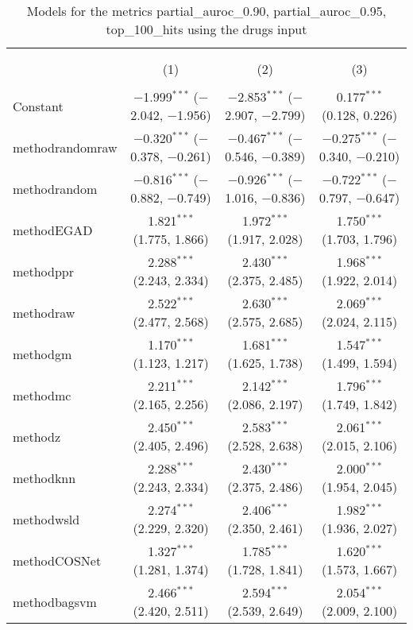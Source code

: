 
\begin{table}[!htbp] \centering 
  \caption{Models for the metrics partial_auroc_0.90, partial_auroc_0.95, top_100_hits using the drugs input} 
  \label{} 
\begin{tabular}{@{\extracolsep{5pt}}lccc} 
\\[-1.8ex]\hline 
\hline \\[-1.8ex] 
\\[-1.8ex] & (1) & (2) & (3)\\ 
\hline \\[-1.8ex] 
 Constant & $-$1.999$^{***}$ ($-$2.042, $-$1.956) & $-$2.853$^{***}$ ($-$2.907, $-$2.799) & 0.177$^{***}$ (0.128, 0.226) \\ 
  methodrandomraw & $-$0.320$^{***}$ ($-$0.378, $-$0.261) & $-$0.467$^{***}$ ($-$0.546, $-$0.389) & $-$0.275$^{***}$ ($-$0.340, $-$0.210) \\ 
  methodrandom & $-$0.816$^{***}$ ($-$0.882, $-$0.749) & $-$0.926$^{***}$ ($-$1.016, $-$0.836) & $-$0.722$^{***}$ ($-$0.797, $-$0.647) \\ 
  methodEGAD & 1.821$^{***}$ (1.775, 1.866) & 1.972$^{***}$ (1.917, 2.028) & 1.750$^{***}$ (1.703, 1.796) \\ 
  methodppr & 2.288$^{***}$ (2.243, 2.334) & 2.430$^{***}$ (2.375, 2.485) & 1.968$^{***}$ (1.922, 2.014) \\ 
  methodraw & 2.522$^{***}$ (2.477, 2.568) & 2.630$^{***}$ (2.575, 2.685) & 2.069$^{***}$ (2.024, 2.115) \\ 
  methodgm & 1.170$^{***}$ (1.123, 1.217) & 1.681$^{***}$ (1.625, 1.738) & 1.547$^{***}$ (1.499, 1.594) \\ 
  methodmc & 2.211$^{***}$ (2.165, 2.256) & 2.142$^{***}$ (2.086, 2.197) & 1.796$^{***}$ (1.749, 1.842) \\ 
  methodz & 2.450$^{***}$ (2.405, 2.496) & 2.583$^{***}$ (2.528, 2.638) & 2.061$^{***}$ (2.015, 2.106) \\ 
  methodknn & 2.288$^{***}$ (2.243, 2.334) & 2.430$^{***}$ (2.375, 2.486) & 2.000$^{***}$ (1.954, 2.045) \\ 
  methodwsld & 2.274$^{***}$ (2.229, 2.320) & 2.406$^{***}$ (2.350, 2.461) & 1.982$^{***}$ (1.936, 2.027) \\ 
  methodCOSNet & 1.327$^{***}$ (1.281, 1.374) & 1.785$^{***}$ (1.728, 1.841) & 1.620$^{***}$ (1.573, 1.667) \\ 
  methodbagsvm & 2.466$^{***}$ (2.420, 2.511) & 2.594$^{***}$ (2.539, 2.649) & 2.054$^{***}$ (2.009, 2.100) \\ 

\end{tabular}
\end{table}
